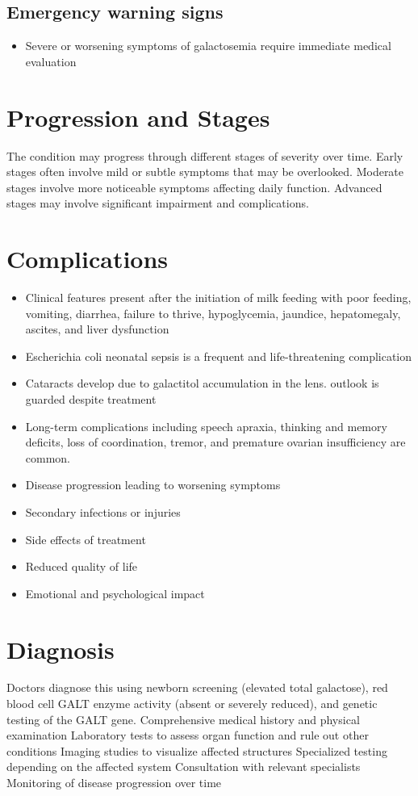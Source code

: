 \subsection{Emergency warning signs}
\begin{itemize}[noitemsep]
  \item Severe or worsening symptoms of galactosemia require immediate medical evaluation
\end{itemize}
\section{Progression and Stages}
The condition may progress through different stages of severity over time. Early stages often involve mild or subtle symptoms that may be overlooked. Moderate stages involve more noticeable symptoms affecting daily function. Advanced stages may involve significant impairment and complications.
\section{Complications}
\begin{itemize}[noitemsep]
  \item Clinical features present after the initiation of milk feeding with poor feeding, vomiting, diarrhea, failure to thrive, hypoglycemia, jaundice, hepatomegaly, ascites, and liver dysfunction
  \item Escherichia coli neonatal sepsis is a frequent and life-threatening complication
  \item Cataracts develop due to galactitol accumulation in the lens. outlook is guarded despite treatment
  \item Long-term complications including speech apraxia, thinking and memory deficits, loss of coordination, tremor, and premature ovarian insufficiency are common.
  \item Disease progression leading to worsening symptoms
  \item Secondary infections or injuries
  \item Side effects of treatment
  \item Reduced quality of life
  \item Emotional and psychological impact
\end{itemize}
\section{Diagnosis}
Doctors diagnose this using newborn screening (elevated total galactose), red blood cell GALT enzyme activity (absent or severely reduced), and genetic testing of the GALT gene. Comprehensive medical history and physical examination Laboratory tests to assess organ function and rule out other conditions Imaging studies to visualize affected structures Specialized testing depending on the affected system Consultation with relevant specialists Monitoring of disease progression over time

